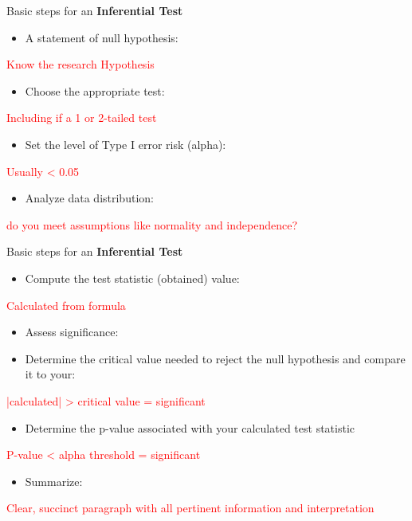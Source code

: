 \documentclass[
  ignorenonframetext,
]{beamer}
\providecommand{\tightlist}{%
  \setlength{\itemsep}{0pt}\setlength{\parskip}{0pt}}
\begin{document}
\begin{frame}{Basic steps for an \textbf{Inferential Test}}
\label{basic-steps-for-an-inferential-test}
\begin{itemize}
\tightlist
\item
  A statement of null hypothesis:
\end{itemize}

\centering\textcolor{red}{Know the research Hypothesis}~

\begin{itemize}
\tightlist
\item
  Choose the appropriate test:
\end{itemize}

\centering\textcolor{red}{Including if a 1 or 2-tailed test}~

\begin{itemize}
\tightlist
\item
  Set the level of Type I error risk (alpha):
\end{itemize}

\centering\textcolor{red}{Usually < 0.05}~

\begin{itemize}
\tightlist
\item
  Analyze data distribution:
\end{itemize}

\centering\textcolor{red}{do you meet assumptions like normality and independence?}~
\end{frame}

\begin{frame}{Basic steps for an \textbf{Inferential Test}}
\label{basic-steps-for-an-inferential-test-1}
\begin{itemize}
\tightlist
\item
  Compute the test statistic (obtained) value:
\end{itemize}

\centering\textcolor{red}{Calculated from formula}~

\begin{itemize}
\item
  Assess significance:
\item
  Determine the critical value needed to reject the null hypothesis and
  compare it to your:
\end{itemize}

\centering\textcolor{red}{|calculated| > critical value = significant}~

\begin{itemize}
\tightlist
\item
  Determine the p-value associated with your calculated test statistic
\end{itemize}

\centering\textcolor{red}{P-value < alpha threshold = significant}~

\begin{itemize}
\tightlist
\item
  Summarize:
\end{itemize}

\centering\textcolor{red}{Clear, succinct paragraph with all pertinent information and interpretation}~
\end{frame}
\end{document}
